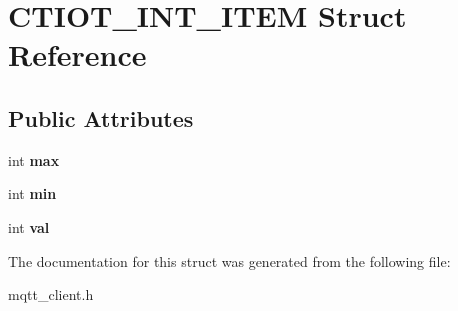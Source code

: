 \hypertarget{struct_c_t_i_o_t___i_n_t___i_t_e_m}{}\section{C\+T\+I\+O\+T\+\_\+\+I\+N\+T\+\_\+\+I\+T\+EM Struct Reference}
\label{struct_c_t_i_o_t___i_n_t___i_t_e_m}
\subsection*{Public Attributes}
\begin{DoxyCompactItemize}
\item 
\mbox{\label{struct_c_t_i_o_t___i_n_t___i_t_e_m_a2e185b09c007052d28c9d549331af3b8}} 
int {\bfseries max}
\item 
\mbox{\label{struct_c_t_i_o_t___i_n_t___i_t_e_m_a0519faf3e7818b61e962f5ecaa95e711}} 
int {\bfseries min}
\item 
\mbox{\label{struct_c_t_i_o_t___i_n_t___i_t_e_m_a93062deec58333d1b19fbeb7a6437593}} 
int {\bfseries val}
\end{DoxyCompactItemize}


The documentation for this struct was generated from the following file\+:\begin{DoxyCompactItemize}
\item 
mqtt\+\_\+client.\+h\end{DoxyCompactItemize}

